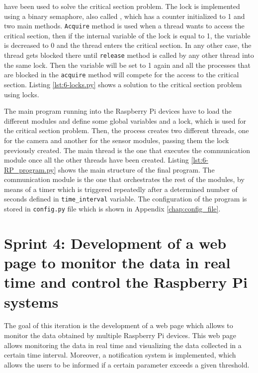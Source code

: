  have been used to solve the critical section problem. The lock is implemented using a binary semaphore, also called , which has a counter initialized to 1 and two main methods. \texttt{Acquire} method is used when a thread wants to access the critical section, then if the internal variable of the lock is equal to 1, the variable is decreased to 0 and the thread enters the critical section. In any other case, the thread gets blocked there until \texttt{release} method is called by any other thread into the same lock. Then the variable will be set to 1 again and all the processes that are blocked in the \texttt{acquire} method will compete for the access to the critical section. Listing \ref{lst:6-locks.py} shows a solution to the critical section problem using locks.



The main program running into the Raspberry Pi devices have to load the different modules and define some global variables and a lock, which is used for the critical section problem. Then, the process creates two different threads, one for the camera and another for the sensor modules, passing them the lock previously created. The main thread is the one that executes the communication module once all the other threads have been created. Listing \ref{lst:6-RP_program.py} shows the main structure of the final program. The communication module is the one that orchestrates the rest of the modules, by means of a timer which is triggered repeatedly after a determined number of seconds defined in \texttt{time\_interval} variable. The configuration of the program is stored in \texttt{config.py} file which is shown in Appendix \ref{chap:config_file}.





\section{Sprint 4: Development of a web page to monitor the data in real time and control the Raspberry Pi systems}
The goal of this iteration is the development of a web page which allows to monitor the data obtained by multiple Raspberry Pi devices. This web page allows monitoring the data in real time and visualizing the data collected in a certain time interval. Moreover, a notification system is implemented, which allows the users to be informed if a certain parameter exceeds a given threshold.

